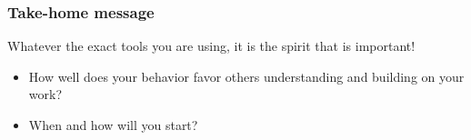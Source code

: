 \documentclass[c]{beamer} %
\begin{document}
\begin{frame}
  \frametitle{Take-home message}
  Whatever the exact tools you are using, it is the spirit that is important!
  
  \bigskip
  \pause
  
  \begin{itemize}
  \item How well does your behavior favor others understanding and building on your work?
    \bigskip
  \item When and how will you start?
  \end{itemize}
\end{frame}
\end{document}
